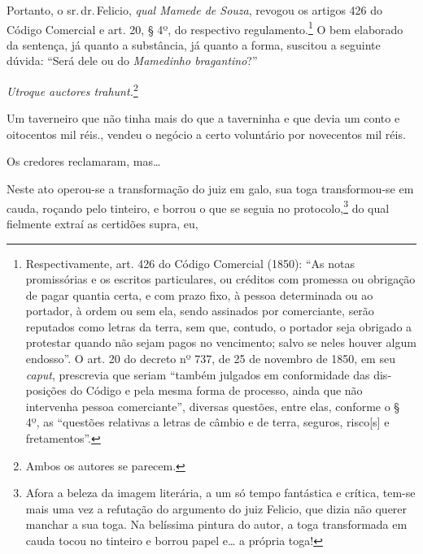 Portanto, o sr.\,dr.\,Felicio, \emph{qual Mamede de Souza}, revogou os
artigos 426 do Código Comercial e art. 20, § 4º, do respectivo
regulamento.\footnote{ Respectivamente, art. 426 do Código Comercial
  (1850): ``As notas promissórias e os escritos particulares, ou créditos
  com promessa ou obrigação de pagar quantia certa, e com prazo fixo, à
  pessoa determinada ou ao portador, à ordem ou sem ela, sendo assinados
  por comerciante, serão reputados como letras da terra, sem que,
  contudo, o portador seja obrigado a protestar quando não sejam pagos
  no vencimento; salvo se neles houver algum endosso''. O art. 20 do
  decreto nº 737, de 25 de novembro de 1850, em seu \emph{caput}, prescrevia que
  seriam ``também julgados em conformidade das dis­posições do Código e
  pela mesma forma de processo, ainda que não intervenha pessoa
  comerciante'', diversas questões, entre elas, conforme o § 4º, as
  ``questões relativas a letras de câmbio e de terra, seguros,
  risco{[}s{]} e fretamentos''.} O bem elaborado da sentença, já quanto a
substância, já quanto a forma, suscitou a seguinte dúvida: ``Será dele ou
do \emph{Mamedinho bragantino}?''

\emph{Utroque auctores trahunt.}\footnote{ Ambos os autores se parecem.}

\asterisc{}

Um taverneiro que não tinha mais do que a taverninha e que devia um
conto e oitocentos mil réis., vendeu o negócio a certo voluntário por
novecentos mil réis.

Os credores reclamaram, mas\ldots{}

Neste ato operou-se a transformação do juiz em galo, sua toga
transformou-se em cauda, roçando pelo tinteiro, e borrou o que se seguia
no protocolo,\footnote{ Afora a beleza da imagem literária, a um só
  tempo fantástica e crítica, tem-se mais uma vez a refutação do
  argumento do juiz Felicio, que dizia não querer manchar a sua toga. Na
  belíssima pintura do autor, a toga transformada em cauda tocou no
  tinteiro e borrou papel e\ldots{} a própria toga!} do qual fielmente extraí
as certidões supra, eu,

